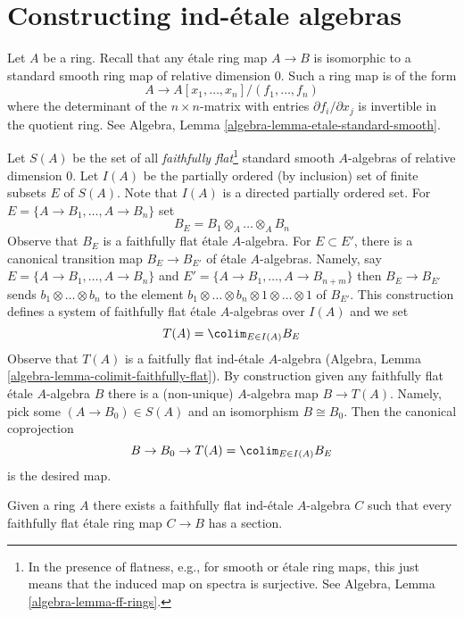 \section{Constructing ind-\'etale algebras}
\label{section-construction-ind-etale}

\noindent
Let $A$ be a ring. Recall that any \'etale ring map $A \to B$ is isomorphic
to a standard smooth ring map of relative dimension $0$. Such a ring map
is of the form
$$
A \longrightarrow A[x_1, \ldots, x_n]/(f_1, \ldots, f_n)
$$
where the determinant of the $n \times n$-matrix with entries
$\partial f_i/\partial x_j$ is invertible in the quotient ring. See
Algebra, Lemma \ref{algebra-lemma-etale-standard-smooth}.

\medskip\noindent
Let $S(A)$ be the set of all {\it faithfully flat}\footnote{In the presence
of flatness, e.g., for smooth or \'etale ring maps,
this just means that the induced map on spectra is surjective. See
Algebra, Lemma \ref{algebra-lemma-ff-rings}.}
standard smooth $A$-algebras of relative dimension $0$.
Let $I(A)$ be the partially ordered (by inclusion) set of finite
subsets $E$ of $S(A)$. Note that $I(A)$ is a directed partially
ordered set. For $E = \{A \to B_1, \ldots, A \to B_n\}$ set
$$
B_E = B_1 \otimes_A \ldots \otimes_A B_n
$$
Observe that $B_E$ is a faithfully flat \'etale $A$-algebra.
For $E \subset E'$, there is a canonical transition map $B_E \to B_{E'}$
of \'etale $A$-algebras. Namely, say $E = \{A \to B_1, \ldots, A \to B_n\}$
and $E' = \{A \to B_1, \ldots, A \to B_{n + m}\}$ then
$B_E \to B_{E'}$ sends $b_1 \otimes \ldots \otimes b_n$ to the
element $b_1 \otimes \ldots \otimes b_n \otimes 1 \otimes \ldots \otimes 1$
of $B_{E'}$. This construction defines a system of faithfully flat
\'etale $A$-algebras over $I(A)$ and we set
$$
T(A) = \colim_{E \in I(A)} B_E
$$
Observe that $T(A)$ is a faitfully flat ind-\'etale $A$-algebra
(Algebra, Lemma \ref{algebra-lemma-colimit-faithfully-flat}). By construction
given any faithfully flat \'etale $A$-algebra $B$ there is a (non-unique)
$A$-algebra map $B \to T(A)$. Namely, pick some $(A \to B_0) \in S(A)$
and an isomorphism $B \cong B_0$. Then the canonical coprojection
$$
B \to B_0 \to 
T(A) = \colim_{E \in I(A)} B_E
$$
is the desired map.

\begin{lemma}
\label{lemma-first-construction}
Given a ring $A$ there exists a faithfully flat ind-\'etale $A$-algebra $C$
such that every faithfully flat \'etale ring map $C \to B$ has a section.
\end{lemma}

